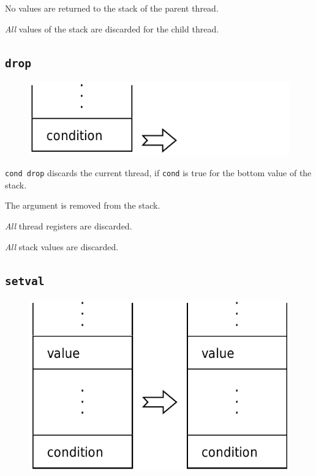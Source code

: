 			No values are returned to the stack of the parent thread.

			\emph{All} values of the stack are discarded for the child thread.
	
	\qquad

	\subsection*{\texttt{drop}}
	
		\begin{figure}
			\begin{flushright}
				\includegraphics[width=\linewidth]{figure/pdf/i_drop} 
			\end{flushright}
		\end{figure}
	
			\texttt{cond drop} discards the current thread, if \texttt{cond} is
			true for the bottom value of the stack.
			
			The argument is removed from the stack.
			
			\emph{All} thread registers are discarded.
			
			\emph{All} stack values are discarded.
	
	\qquad

	\subsection*{\texttt{setval}}
	
		\begin{figure}
			\begin{flushright}
				\includegraphics[width=\linewidth]{figure/pdf/i_setval} 
			\end{flushright}
		\end{figure}
	
